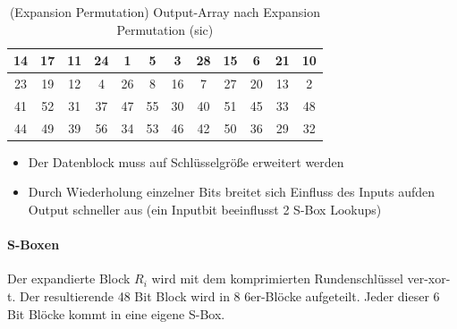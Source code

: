 \begin{table}[h]
    \centering
    \begin{tabular}{|*{12}{c|}}
        \hline
        \cellcolor{orange-1}14 & \cellcolor{yellow-1}17 & \cellcolor{orange-1}11 & \cellcolor{yellow-1}24 & \cellcolor{red-1}1 & 
        \cellcolor{red-1}5 & \cellcolor{red-1}3 & \cellcolor{green-1}28 & \cellcolor{orange-1}15 & \cellcolor{red-1}6 & 
        \cellcolor{yellow-1}21 & \cellcolor{orange-1}10 \\
        \hline 
        \cellcolor{yellow-1}23 & \cellcolor{yellow-1}19 & \cellcolor{orange-1}12 & \cellcolor{red-1}4 & \cellcolor{green-1}26 & 
        \cellcolor{red-1}8 & \cellcolor{orange-1}16 & \cellcolor{red-1}7 & \cellcolor{green-1}27 & \cellcolor{yellow-1}20 & 
        \cellcolor{orange-1}13 & \cellcolor{red-1}2 \\
        \hline 
        \cellcolor{blue-1}41 & \cellcolor{blue-1}52 & \cellcolor{green-1}31 & \cellcolor{blue-1}37 & \cellcolor{blue-1}47 & 
        \cellcolor{blue-1}55 & \cellcolor{green-1}30 & \cellcolor{blue-1}40 & \cellcolor{blue-1}51 & \cellcolor{blue-1}45 & 
        \cellcolor{blue-1}33 & \cellcolor{blue-1}48 \\
        \hline
        \cellcolor{blue-1}44 & \cellcolor{blue-1}49 & \cellcolor{blue-1}39 & \cellcolor{blue-1}56 & \cellcolor{blue-1}34 & 
        \cellcolor{blue-1}53 & \cellcolor{blue-1}46 & \cellcolor{blue-1}42 & \cellcolor{blue-1}50 & \cellcolor{blue-1}36 & 
        \cellcolor{green-1}29 & \cellcolor{green-1}32 \\
        \hline 
    \end{tabular}
    \caption{(Expansion Permutation) Output-Array nach Expansion Permutation (sic)}
\end{table}

\begin{itemize}
    \item Der Datenblock muss auf Schlüsselgröße erweitert werden
    \item Durch Wiederholung einzelner Bits breitet sich Einfluss des Inputs aufden Output schneller aus (ein Inputbit beeinflusst 2 S-Box Lookups)
\end{itemize}

\paragraph{S-Boxen}

Der expandierte Block $R_i$ wird mit dem komprimierten Rundenschlüssel ver-xor-t. Der resultierende 48 Bit Block wird in 8 6er-Blöcke aufgeteilt. Jeder dieser 6 Bit 
Blöcke kommt in eine eigene S-Box.

